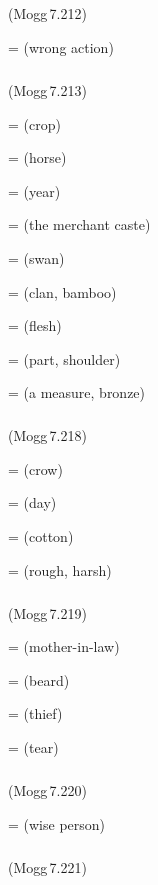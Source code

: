 \subparagraph*{} (Mogg\,7.212)\label{pacckx:ribbisa}

 =  (wrong action)\par

\subparagraph*{} (Mogg\,7.213)\label{pacckx:sa}

 =  (crop)\par
{} =  (horse)\par
{} =  (year)\par
{} =  (the merchant caste)\par
{} =  (swan)\par
{} =  (clan, bamboo)\par
{} =  (flesh)\par
{} =  (part, shoulder)\par
{} =  (a measure, bronze)\par

\subparagraph*{} (Mogg\,7.218)\label{pacckx:asadna}\label{pacckx:paasa}\label{pacckx:kasa}

 =  (crow)\par
{} =  (day)\par
{} =  (cotton)\par
{} =  (rough, harsh)\par

\subparagraph*{} (Mogg\,7.219)\label{pacckx:su}

 =  (mother-in-law)\par
{} =  (beard)\par
{} =  (thief)\par
{} =  (tear)\par

\subparagraph*{} (Mogg\,7.220)\label{pacckx:dusuka}

 =  (wise person)\par

\subparagraph*{} (Mogg\,7.221)\label{pacckx:riiha}

